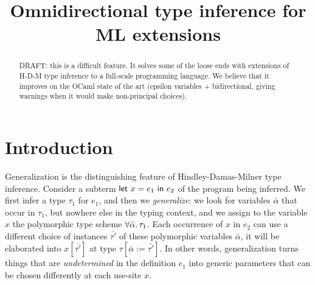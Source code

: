 \documentclass[acmsmall,screen,nonacm]{acmart}
\begin{document}
\title{Omnidirectional type inference for ML extensions}

\begin{abstract}


  DRAFT: this is a difficult feature. It solves some of the loose ends
  with extensions of H-D-M type inference to a full-scale programming
  language. We believe that it improves on the OCaml state of the art
  (epsilon variables + bidirectional, giving warnings when it would
  make non-principal choices).
\end{abstract}


\maketitle

\section{Introduction}

Generalization is the distinguishing feature of Hindley-Damas-Milner type inference. Consider a subterm $\mathsf{let} ~ x = e_1 ~ \mathsf{in} ~ e_2$ of the program being inferred. We first infer a type $\tau_1$ for $e_1$, and then we \emph{generalize}: we look for variables $\bar{\alpha}$ that occur in $\tau_1$, but nowhere else in the typing context, and we assign to the variable $x$ the polymorphic type scheme $\forall {\bar{\alpha}}.\,{\tau_1}$. Each occurrence of $x$ in $e_2$ can use a different choice of instances $\bar{\tau'}$ of these polymorphic variables $\bar{\alpha}$, it will be elaborated into $x [\bar{\tau'}]$ at type $\tau[\bar{\alpha} := \bar{\tau'}]$. In other words, generalization turns things that are \emph{undetermined} in the definition $e_1$ into generic parameters that can be chosen differently at each use-site $x$.
\end{document}
